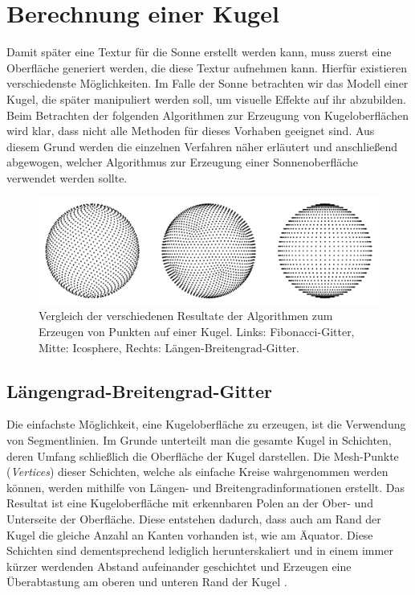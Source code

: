 \section{Berechnung einer Kugel}
Damit später eine Textur für die Sonne erstellt werden kann, muss zuerst eine
Oberfläche generiert werden, die diese Textur aufnehmen kann. Hierfür existieren
verschiedenste Möglichkeiten. Im Falle der Sonne betrachten wir das Modell einer
Kugel, die später manipuliert werden soll, um visuelle Effekte auf ihr
abzubilden. Beim Betrachten der folgenden Algorithmen zur Erzeugung von
Kugeloberflächen wird klar, dass nicht alle Methoden für dieses Vorhaben
geeignet sind. Aus diesem Grund werden die einzelnen Verfahren näher erläutert
und anschließend abgewogen, welcher Algorithmus zur Erzeugung einer
Sonnenoberfläche verwendet werden sollte.

\begin{figure}
  \includegraphics[width=\columnwidth]{spheres}
  \caption{Vergleich der verschiedenen Resultate der Algorithmen zum Erzeugen von Punkten auf einer Kugel. Links: Fibonacci-Gitter, Mitte: Icosphere, Rechts: Längen-Breitengrad-Gitter.}
\end{figure}

\subsection{Längengrad-Breitengrad-Gitter}
Die einfachste Möglichkeit, eine Kugeloberfläche zu erzeugen, ist die Verwendung
von Segmentlinien. Im Grunde unterteilt man die gesamte Kugel in Schichten,
deren Umfang schließlich die Oberfläche der Kugel darstellen. Die Mesh-Punkte
(\textit{Vertices}) dieser Schichten, welche als einfache Kreise wahrgenommen
werden können, werden mithilfe von Längen- und Breitengradinformationen
erstellt. Das Resultat ist eine Kugeloberfläche mit erkennbaren Polen an der
Ober- und Unterseite der Oberfläche. Diese entstehen dadurch, dass auch am Rand
der Kugel die gleiche Anzahl an Kanten vorhanden ist, wie am Äquator. Diese
Schichten sind dementsprechend lediglich herunterskaliert und in einem immer
kürzer werdenden Abstand aufeinander geschichtet und Erzeugen eine Überabtastung
am oberen und unteren Rand der Kugel \cite{Gonzalez2009}.

